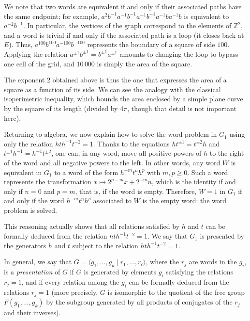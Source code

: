 \documentclass{amsart}
\begin{document}
We note that two words are equivalent if and only if their associated
paths have the same endpoint; for example,
$a^2 b^{-1} a^{-1} b^{-1} a^{-1} b^{-1} a^{-1} b a^{-1} b$ is
equivalent to $a^{-2} b^{-1}$. In particular, the vertices of the
graph correspond to the elements of $\mathbb{Z}^2$, and a word is
trivial if and only if the associated path is a loop (it closes back
at $E$). Thus, $a^{100} b^{100} a^{-100} b^{-100}$ represents the
boundary of a square of side $100$. Applying the relation
$a^{\pm1} b^{\pm1} = b^{\pm1} a^{\pm1}$ amounts to changing the loop to
bypass one cell of the grid, and $10\,000$ is simply the area of the
square.

The exponent $2$ obtained above is thus the one that expresses the
area of a square as a function of its side. We can see the analogy
with the classical isoperimetric inequality, which bounds the area
enclosed by a simple plane curve by the square of its length (divided by
$4\pi$, though that detail is not important here).

Returning to algebra, we now explain how to solve the word
problem in $G_1$ using only the relation $h t h^{-1} t^{-2} =
1$. Thanks to the equations $h t^{\pm1} = t^{\pm2} h$ and
$t^{\pm1} h^{-1} = h^{-1} t^{\pm2}$, one can, in any word, move all
positive powers of $h$ to the right of the word and all negative
powers to the left. In other words, any word $W$ is equivalent in
$G_1$ to a word of the form $h^{-m} t^n h^p$ with $m, p \ge 0$. Such a
word represents the transformation $x \mapsto 2^{p - m} x + 2^{-m} n$,
which is the identity if and only if $n = 0$ and $p = m$, that is, if
the word is empty. Therefore, $W = 1$ in $G_1$ if and only if the word
$h^{-m} t^n h^p$ associated to $W$ is the empty word: the word problem
is solved.

This reasoning actually shows that all relations satisfied by $h$ and
$t$ can be formally deduced from the relation $h t h^{-1} t^{-2} =
1$. We say that $G_1$ is presented by the generators $h$ and $t$
subject to the relation $h t h^{-1} t^{-2} = 1$.

In general, we say that
$G = \langle g_1,\dots, g_k\mid r_1,\dots,r_\ell \rangle$, where
the $r_j$ are words in the $g_i$, is a \textit{presentation} of $G$ if $G$ is
generated by elements $g_i$ satisfying the relations $r_j = 1$, and if
every relation among the $g_i$ can be formally deduced from the
relations $r_j = 1$ (more precisely, $G$ is isomorphic to the quotient
of the free group $F(g_1, \dots, g_k)$ by the subgroup generated by
all products of conjugates of the $r_j$ and their inverses).
\end{document}
